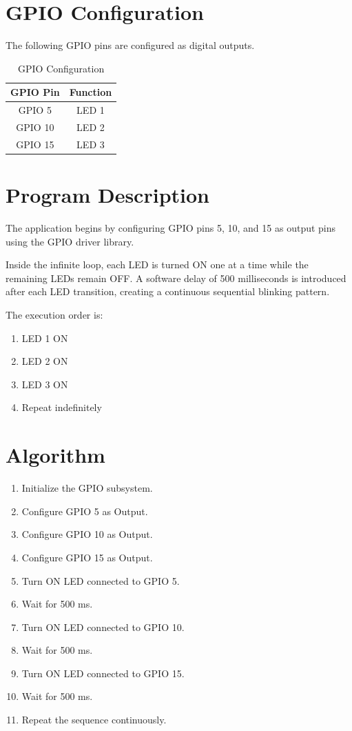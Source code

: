 \documentclass[12pt]{article}
\begin{document}
\section{GPIO Configuration}

The following GPIO pins are configured as digital outputs.

\begin{table}[h]
\centering
\begin{tabular}{cc}
\toprule
GPIO Pin & Function\\
\midrule
GPIO 5 & LED 1\\
GPIO 10 & LED 2\\
GPIO 15 & LED 3\\
\bottomrule
\end{tabular}
\caption{GPIO Configuration}
\end{table}

\section{Program Description}

The application begins by configuring GPIO pins 5, 10, and 15 as output pins using the GPIO driver library.

Inside the infinite loop, each LED is turned ON one at a time while the remaining LEDs remain OFF. A software delay of 500 milliseconds is introduced after each LED transition, creating a continuous sequential blinking pattern.

The execution order is:

\begin{enumerate}
\item LED 1 ON
\item LED 2 ON
\item LED 3 ON
\item Repeat indefinitely
\end{enumerate}

\section{Algorithm}

\begin{enumerate}
\item Initialize the GPIO subsystem.
\item Configure GPIO 5 as Output.
\item Configure GPIO 10 as Output.
\item Configure GPIO 15 as Output.
\item Turn ON LED connected to GPIO 5.
\item Wait for 500 ms.
\item Turn ON LED connected to GPIO 10.
\item Wait for 500 ms.
\item Turn ON LED connected to GPIO 15.
\item Wait for 500 ms.
\item Repeat the sequence continuously.
\end{enumerate}
\end{document}
